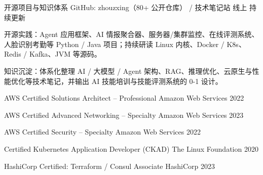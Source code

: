 
\begin{cventries}
  \cventry
    {开源项目与知识体系}
    {GitHub: zhouzxing（80+ 公开仓库） / 技术笔记站}
    {线上}
    {持续更新}
    {
      \begin{cvitems}
        \item {开源实践：Agent 应用框架、AI 情报聚合器、服务器/集群监控、在线评测系统、人脸识别考勤等 Python / Java 项目；持续研读 Linux 内核、Docker / K8s、Redis / Kafka、JVM 等源码。}
        \item {知识沉淀：体系化整理 AI / 大模型 / Agent 架构、RAG、推理优化、云原生与性能优化等技术笔记，并输出 AI 技能培训与技能评测系统的 0-1 设计。}
      \end{cvitems}
    }
\end{cventries}


\begin{cvhonors}

  \cvhonor
    {AWS Certified Solutions Architect -- Professional}
    {Amazon Web Services}
    {}
    {2022}

  \cvhonor
    {AWS Certified Advanced Networking -- Specialty}
    {Amazon Web Services}
    {}
    {2023}

  \cvhonor
    {AWS Certified Security -- Specialty}
    {Amazon Web Services}
    {}
    {2022}

  \cvhonor
    {Certified Kubernetes Application Developer (CKAD)}
    {The Linux Foundation}
    {}
    {2020}

  \cvhonor
    {HashiCorp Certified: Terraform / Consul Associate}
    {HashiCorp}
    {}
    {2023}

\end{cvhonors}
